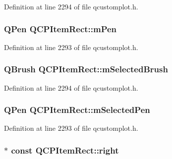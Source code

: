 Definition at line 2294 of file qcustomplot.\-h.

\hypertarget{class_q_c_p_item_rect_aa0d49323628d6752026056bfb52afd86}{
\subsubsection[{m\-Pen}]{\setlength{\rightskip}{0pt plus 5cm}Q\-Pen Q\-C\-P\-Item\-Rect\-::m\-Pen\hspace{0.3cm}{\ttfamily [protected]}}}\label{class_q_c_p_item_rect_aa0d49323628d6752026056bfb52afd86}


Definition at line 2293 of file qcustomplot.\-h.

\hypertarget{class_q_c_p_item_rect_a21b70eee59b6e19ae0bbdf037b13508f}{
\subsubsection[{m\-Selected\-Brush}]{\setlength{\rightskip}{0pt plus 5cm}Q\-Brush Q\-C\-P\-Item\-Rect\-::m\-Selected\-Brush\hspace{0.3cm}{\ttfamily [protected]}}}\label{class_q_c_p_item_rect_a21b70eee59b6e19ae0bbdf037b13508f}


Definition at line 2294 of file qcustomplot.\-h.

\hypertarget{class_q_c_p_item_rect_a73cc0bee61de3c67221ec8c7a76a29ed}{
\subsubsection[{m\-Selected\-Pen}]{\setlength{\rightskip}{0pt plus 5cm}Q\-Pen Q\-C\-P\-Item\-Rect\-::m\-Selected\-Pen\hspace{0.3cm}{\ttfamily [protected]}}}\label{class_q_c_p_item_rect_a73cc0bee61de3c67221ec8c7a76a29ed}


Definition at line 2293 of file qcustomplot.\-h.

\hypertarget{class_q_c_p_item_rect_a7979c1915f61ad2609a9cc179c2e445e}{
\subsubsection[{right}]{$\ast$ const Q\-C\-P\-Item\-Rect\-::right}}\label{class_q_c_p_item_rect_a7979c1915f61ad2609a9cc179c2e445e}


